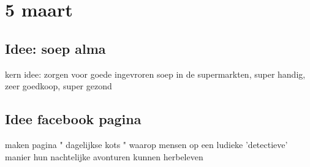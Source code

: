 \section{5 maart }
\subsection{Idee: soep alma}
kern idee: zorgen voor goede ingevroren soep in de supermarkten, super handig, zeer goedkoop, super gezond
\subsection{Idee facebook pagina}
maken pagina " dagelijkse kots  " waarop mensen op een ludieke 'detectieve' manier hun nachtelijke avonturen kunnen herbeleven 

